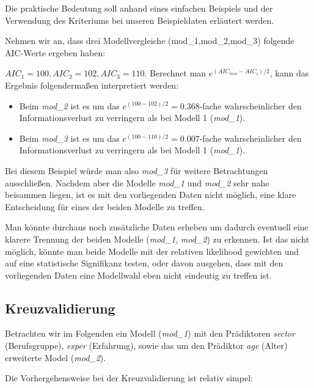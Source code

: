 \documentclass[]{article}
\providecommand{\tightlist}{%
  \setlength{\itemsep}{0pt}\setlength{\parskip}{0pt}}
\begin{document}
Die praktische Bedeutung soll anhand eines einfachen Beispiels und der
Verwendung des Kriteriums bei unseren Beispieldaten erläutert werden.

Nehmen wir an, dass drei Modellvergleiche (mod\_1,mod\_2,mod\_3)
folgende AIC-Werte ergeben haben:

\(AIC_1 = 100, AIC_2 = 102, AIC_3 = 110\). Berechnet man
\(e^{(AIC_{min} - AIC_i)/2}\), kann das Ergebnis folgendermaßen
interpretiert werden:

\begin{itemize}
\tightlist
\item
  Beim \emph{mod\_2} ist es um das \(e^{(100-102)/2} = 0.368\)-fache
  wahrscheinlicher den Informationsverlust zu verringern als bei Modell
  1 (\emph{mod\_1}).
\item
  Beim \emph{mod\_3} ist es um das \(e^{(100-110)/2} = 0.007\)-fache
  wahrscheinlicher den Informationsverlust zu verringern als bei Modell
  1 (\emph{mod\_1}).
\end{itemize}

Bei diesem Beispiel würde man also \emph{mod\_3} für weitere
Betrachtungen ausschließen. Nachdem aber die Modelle \emph{mod\_1} und
\emph{mod\_2} sehr nahe beisammen liegen, ist es mit den vorliegenden
Daten nicht möglich, eine klare Entscheidung für eines der beiden
Modelle zu treffen.

Man könnte durchaus noch zusätzliche Daten erheben um dadurch eventuell
eine klarere Trennung der beiden Modelle (\emph{mod\_1}, \emph{mod\_2})
zu erkennen. Ist das nicht möglich, könnte man beide Modelle mit der
relativen likelihood gewichten und auf eine statistische Signifikanz
testen, oder davon ausgehen, dass mit den vorliegenden Daten eine
Modellwahl eben nicht eindeutig zu treffen ist.

\subsection*{Kreuzvalidierung}\label{kreuzvalidierung}

Betrachten wir im Folgenden ein Modell (\emph{mod\_1}) mit den
Prädiktoren \emph{sector} (Berufsgruppe), \emph{exper} (Erfahrung),
sowie das um den Prädiktor \emph{age} (Alter) erweiterte Model
(\emph{mod\_2}).

Die Vorhergehensweise bei der Kreuzvalidierung ist relativ simpel:
\end{document}
